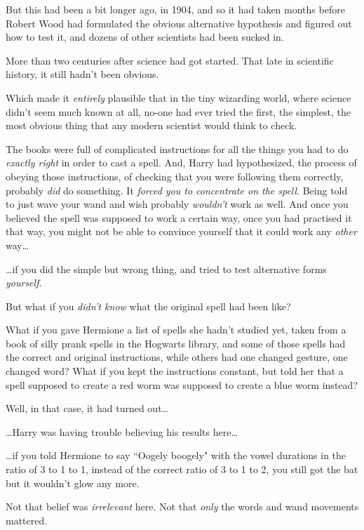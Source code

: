 But this had been a bit longer ago, in 1904, and so it had taken months before Robert Wood had formulated the obvious alternative hypothesis and figured out how to test it, and dozens of other scientists had been sucked in.

More than two centuries after science had got started. That late in scientific history, it still hadn't been obvious.

Which made it \emph{entirely} plausible that in the tiny wizarding world, where science didn't seem much known at all, no-one had ever tried the first, the simplest, the most obvious thing that any modern scientist would think to check.

The books were full of complicated instructions for all the things you had to do \emph{exactly right} in order to cast a spell. And, Harry had hypothesized, the process of obeying those instructions, of checking that you were following them correctly, probably \emph{did} do something. It \emph{forced you to concentrate on the spell}. Being told to just wave your wand and wish probably \emph{wouldn't} work as well. And once you believed the spell was supposed to work a certain way, once you had practised it that way, you might not be able to convince yourself that it could work any \emph{other} way{\ldots}

{\ldots}if you did the simple but wrong thing, and tried to test alternative forms \emph{yourself}.

But what if you \emph{didn't know} what the original spell had been like?

What if you gave Hermione a list of spells she hadn't studied yet, taken from a book of silly prank spells in the Hogwarts library, and some of those spells had the correct and original instructions, while others had one changed gesture, one changed word? What if you kept the instructions constant, but told her that a spell supposed to create a red worm was supposed to create a blue worm instead?

Well, in that case, it had turned out{\ldots}

{\ldots}Harry was having trouble believing his results here{\ldots}

{\ldots}if you told Hermione to say ``Oogely boogely" with the vowel durations in the ratio of 3 to 1 to 1, instead of the correct ratio of 3 to 1 to 2, you still got the bat but it wouldn't glow any more.

Not that belief was \emph{irrelevant} here. Not that \emph{only} the words and wand movements mattered.

